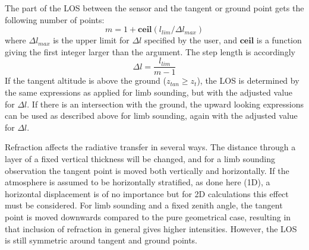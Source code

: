  The part of the LOS between the sensor and the tangent or ground
 point gets the following number of points:
 \begin{equation}
    m = 1 + \mathbf{ ceil}(l_{lim}/\Delta l_{max})
  \label{eq:los:m}
 \end{equation}
 where $\Delta l_{max}$ is the upper limit for $\Delta l$ specified by
 the user, and $\mathbf{ ceil}$ is a function giving the first integer
 larger than the argument. The step length is accordingly
 \begin{equation}
    \Delta l = \frac{l_{lim}}{m-1}
  \label{eq:los:dl}
 \end{equation} 
 If the tangent altitude is above the ground ($z_{tan} \geq z_t$),
 the LOS is determined by the same expressions as applied for limb
 sounding, but with the adjusted value for $\Delta l$.
 If there is an intersection with the ground, the upward
 looking expressions can be used as described above for limb sounding,
 again with the adjusted value for $\Delta l$.


  \label{sec:los:refraction}
  
  Refraction affects the radiative transfer in several ways. The
  distance through a layer of a fixed vertical thickness will be
  changed, and for a limb sounding observation the tangent point is
  moved both vertically and horizontally. If the atmosphere is assumed
  to be horizontally stratified, as done here (1D), a horizontal
  displacement is of no importance but for 2D calculations this effect
  must be considered. For limb sounding and a fixed zenith angle, the
  tangent point is moved downwards compared to the pure geometrical
  case, resulting in that inclusion of refraction in general gives
  higher intensities. However, the LOS is still symmetric around
  tangent and ground points.

  \label{sec:los:reftheory}

